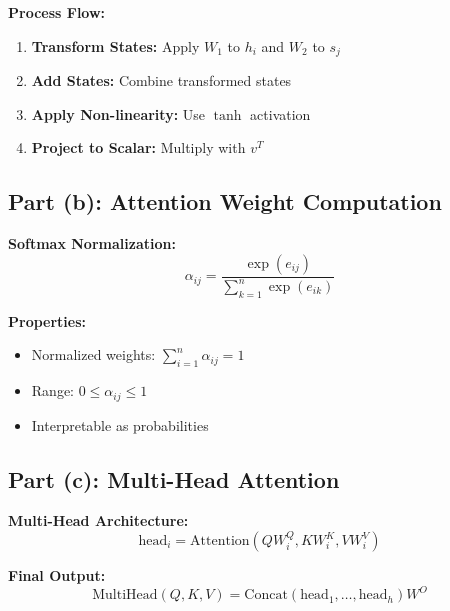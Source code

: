 \documentclass{exam}
\begin{document}
\begin{example}
\textbf{Process Flow:}
\begin{enumerate}[leftmargin=*]
    \item \textbf{Transform States:} Apply $W_1$ to $h_i$ and $W_2$ to $s_j$
    \item \textbf{Add States:} Combine transformed states
    \item \textbf{Apply Non-linearity:} Use $\tanh$ activation
    \item \textbf{Project to Scalar:} Multiply with $v^T$
\end{enumerate}
\end{example}

\subsection*{Part (b): Attention Weight Computation}

\begin{important}
\textbf{Softmax Normalization:}
\begin{equation}
\alpha_{ij} = \frac{\exp(e_{ij})}{\sum_{k=1}^n \exp(e_{ik})}
\end{equation}

\textbf{Properties:}
\begin{itemize}[leftmargin=*]
    \item Normalized weights: $\sum_{i=1}^n \alpha_{ij} = 1$
    \item Range: $0 \leq \alpha_{ij} \leq 1$
    \item Interpretable as probabilities
\end{itemize}
\end{important}

\subsection*{Part (c): Multi-Head Attention}

\begin{concept}
\textbf{Multi-Head Architecture:}
\begin{equation}
\text{head}_i = \text{Attention}(QW^Q_i, KW^K_i, VW^V_i)
\end{equation}

\textbf{Final Output:}
\begin{equation}
\text{MultiHead}(Q, K, V) = \text{Concat}(\text{head}_1, \ldots, \text{head}_h)W^O
\end{equation}
\end{concept}
\end{document}
